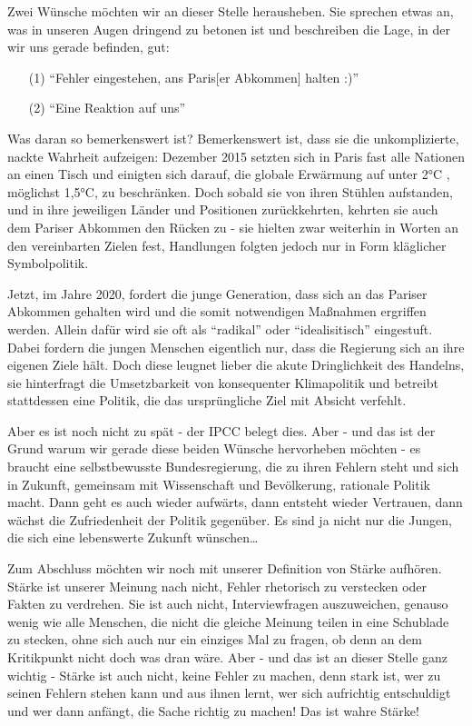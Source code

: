 \documentclass[a4paper, 11.5pt]{article}
\begin{document}
Zwei Wünsche möchten wir an dieser Stelle herausheben. Sie sprechen etwas an, was in unseren Augen dringend zu betonen ist und beschreiben die Lage, in der wir uns gerade befinden, gut:
\vspace{-0.5\baselineskip}
\begin{itemize}
\item[(1)] “Fehler eingestehen, ans Paris[er Abkommen] halten :)” 
\item[(2)] “Eine Reaktion auf uns” 
\end{itemize}
\vspace{-0.5\baselineskip}
Was daran so bemerkenswert ist? Bemerkenswert ist, dass sie die unkomplizierte, nackte Wahrheit aufzeigen: Dezember 2015 setzten sich in Paris fast alle Nationen an einen Tisch und einigten sich darauf, die globale Erwärmung auf unter 2°C , möglichst 1,5°C, zu beschränken. Doch sobald sie von ihren Stühlen aufstanden, und in ihre jeweiligen Länder und Positionen zurückkehrten, kehrten sie auch dem Pariser Abkommen den Rücken zu - sie hielten zwar weiterhin in Worten an den vereinbarten Zielen fest, Handlungen folgten jedoch nur in Form kläglicher Symbolpolitik. 

Jetzt, im Jahre 2020, fordert die junge Generation, dass sich an das Pariser Abkommen gehalten wird und die somit notwendigen Maßnahmen ergriffen werden. Allein dafür wird sie oft als “radikal” oder “idealisitisch” eingestuft. Dabei fordern die jungen Menschen eigentlich nur, dass die Regierung sich an ihre eigenen Ziele hält. Doch diese leugnet lieber die akute Dringlichkeit des Handelns, sie hinterfragt die Umsetzbarkeit von konsequenter Klimapolitik und betreibt stattdessen eine Politik, die das ursprüngliche Ziel mit Absicht verfehlt. 

Aber es ist noch nicht zu spät - der IPCC belegt dies. Aber - und das ist der Grund warum wir gerade diese beiden Wünsche hervorheben möchten - es braucht eine selbstbewusste Bundesregierung, die zu ihren Fehlern steht und sich in Zukunft, gemeinsam mit Wissenschaft und Bevölkerung, rationale Politik macht. Dann geht es auch wieder aufwärts, dann entsteht wieder Vertrauen, dann wächst die Zufriedenheit der Politik gegenüber. Es sind ja nicht nur die Jungen, die sich eine lebenswerte Zukunft wünschen…

Zum Abschluss möchten wir noch mit unserer Definition von Stärke aufhören. Stärke ist unserer Meinung nach nicht, Fehler rhetorisch zu verstecken oder Fakten zu verdrehen. Sie ist auch nicht, Interviewfragen auszuweichen, genauso wenig wie alle Menschen, die nicht die gleiche Meinung teilen in eine Schublade zu stecken, ohne sich auch nur ein einziges Mal zu fragen, ob denn an dem Kritikpunkt nicht doch was dran wäre. Aber - und das ist an dieser Stelle ganz wichtig - Stärke ist auch nicht, keine Fehler zu machen, denn stark ist, wer zu seinen Fehlern stehen kann und aus ihnen lernt, wer sich aufrichtig entschuldigt und wer dann anfängt, die Sache richtig zu machen! Das ist wahre Stärke!
\end{document}
